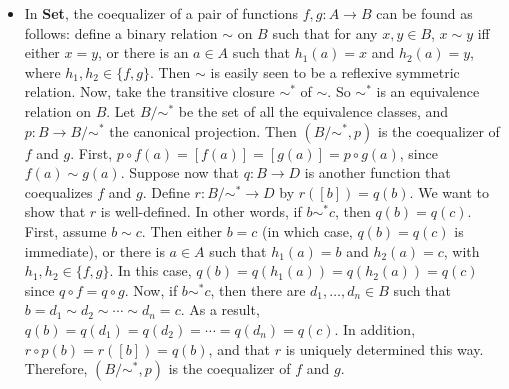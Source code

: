 \documentclass[12pt]{article}
\begin{document}
\begin{itemize}
\item In \textbf{Set}, the coequalizer of a pair of functions $f,g:A\to B$ can be found as follows: define a binary relation $\sim$ on $B$ such that for any $x,y\in B$, $x\sim y$ iff either $x=y$, or there is an $a\in A$ such that $h_1(a)=x$ and $h_2(a)=y$, where $h_1,h_2\in \lbrace f,g\rbrace$.  Then $\sim$ is easily seen to be a reflexive symmetric relation.  Now, take the transitive closure $\sim^*$ of $\sim$.  So $\sim^*$ is an equivalence relation on $B$.  Let $B/\sim^*$ be the set of all the equivalence classes, and $p:B\to B/\sim^*$ the canonical projection.  Then $(B/\sim^*, p)$ is the coequalizer of $f$ and $g$.  First, $p\circ f(a)=[f(a)]=[g(a)]=p\circ g(a)$, since $f(a)\sim g(a)$.  Suppose now that $q:B\to D$ is another function that coequalizes $f$ and $g$.  Define $r:B/\sim^* \to D$ by $r([b])=q(b)$.  We want to show that $r$ is well-defined.  In other words, if $b\sim^* c$, then $q(b)=q(c)$.  First, assume $b\sim c$.  Then either $b=c$ (in which case, $q(b)=q(c)$ is immediate), or there is $a\in A$ such that $h_1(a)=b$ and $h_2(a)=c$, with $h_1,h_2\in \lbrace f,g\rbrace$.  In this case, $q(b)=q(h_1(a))=q(h_2(a))=q(c)$ since $q\circ f=q\circ g$.  Now, if $b\sim^* c$, then there are $d_1,\ldots, d_n \in B$ such that $b=d_1\sim d_2 \sim \cdots \sim d_n = c$.  As a result, $q(b)=q(d_1)=q(d_2)=\cdots = q(d_n)=q(c)$.  In addition, $r\circ p(b)=r([b])=q(b)$, and that $r$ is uniquely determined this way.  Therefore, $(B/\sim^*,p)$ is the coequalizer of $f$ and $g$.
\end{itemize}
\end{document}
